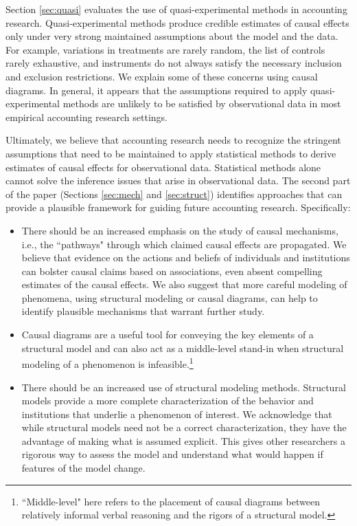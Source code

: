 \documentclass[12pt,reqno,titlepage]{amsart}
\theoremstyle{definition}
\begin{document}
\begin{doublespace}
Section \ref{sec:quasi} evaluates the use of quasi-experimental methods in accounting research. 
Quasi-experimental methods produce credible estimates of causal effects only under very strong maintained assumptions about the model and the data. 
For example, variations in treatments are rarely random, the list of controls rarely exhaustive, and instruments do not always satisfy the necessary inclusion and exclusion restrictions.
We explain some of these concerns using causal diagrams.
In general, it appears that the assumptions required to apply quasi-experimental methods are unlikely to be satisfied by observational data in most empirical accounting research settings.

Ultimately, we believe that accounting research needs to recognize the stringent assumptions that need to be maintained to apply statistical methods to derive estimates of causal effects for observational data.
Statistical methods alone cannot solve the inference issues that arise in observational data. 
The second part of the paper (Sections \ref{sec:mech} and \ref{sec:struct}) identifies approaches that can provide a plausible framework for guiding future accounting research. Specifically: 

\begin{itemize}
\item There should be an increased emphasis on the study of causal mechanisms, i.e., the ``pathways" through which claimed causal effects are propagated.
We believe that evidence on the actions and beliefs of individuals and institutions can bolster causal claims based on associations, even absent compelling estimates of the causal effects.
We also suggest that more careful modeling of phenomena, using structural modeling or causal diagrams, can help to identify plausible mechanisms that warrant further study.
\item Causal diagrams are a useful tool for conveying the key elements of a structural model and can also act as a middle-level stand-in when structural modeling of a phenomenon is infeasible.\footnote{``Middle-level" here refers to the placement of causal diagrams between relatively informal verbal reasoning and the rigors of a structural model.}
\item There should be an increased use of structural modeling methods. 
Structural models provide a more complete characterization of the behavior and institutions that underlie a phenomenon of interest.
We acknowledge that while structural models need not be a correct
characterization, they have the advantage of making what is assumed explicit. This gives other researchers a rigorous way to assess the model and understand what would happen if features of the model change.


\end{itemize}
\end{doublespace}
\end{document}
